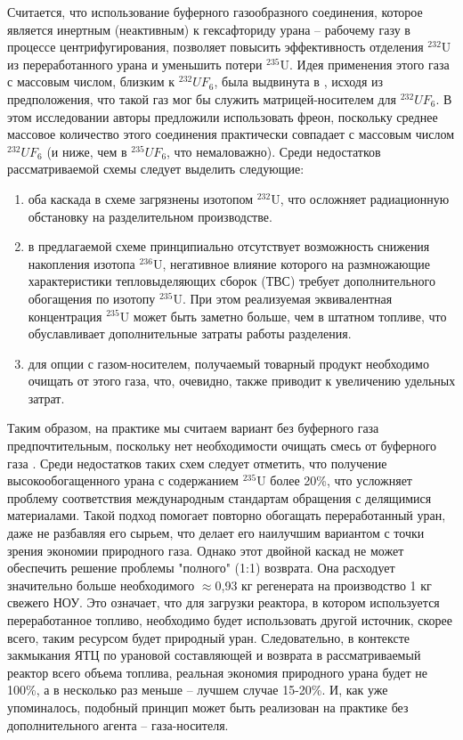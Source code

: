Считается, что использование буферного газообразного соединения, которое является инертным (неактивным) к гексафториду урана -- рабочему газу в процессе центрифугирования, позволяет повысить эффективность отделения $^{232}$U из переработанного урана и уменьшить потери $^{235}$U. Идея применения этого газа с массовым числом, близким к $^{232}UF_6$, была выдвинута в \cite{SosninYuChelcov}, исходя из предположения, что такой газ мог бы служить матрицей-носителем для $^{232}UF_6$. В этом исследовании авторы предложили использовать фреон, поскольку среднее массовое количество этого соединения практически совпадает с массовым числом $^{232}UF_6$ (и ниже, чем в $^{235}UF_6$, что немаловажно).
Среди недостатков рассматриваемой схемы следует выделить следующие:
\begin{enumerate}
  \item оба каскада в схеме загрязнены изотопом $^{232}$U, что осложняет радиационную обстановку на разделительном производстве.
  \item в предлагаемой схеме принципиально отсутствует возможность снижения накопления изотопа $^{236}$U, негативное влияние которого на размножающие характеристики тепловыделяющих сборок (ТВС) требует дополнительного обогащения по изотопу $^{235}$U. При этом реализуемая эквивалентная концентрация $^{235}$U может быть заметно больше, чем в штатном топливе, что обуславливает дополнительные затраты работы разделения.
  \item для опции с газом-носителем, получаемый товарный продукт необходимо очищать от этого газа, что, очевидно, также приводит к увеличению удельных затрат.
\end{enumerate}

Таким образом, на практике мы считаем вариант без буферного газа предпочтительным, поскольку нет необходимости очищать смесь от буферного газа \cite{smirnovKaskadnyeShemyZadachah2012}. Среди недостатков таких схем следует отметить, что получение высокообогащенного урана с содержанием $^{235}$U более 20\%, что усложняет проблему соответствия международным стандартам обращения с делящимися материалами.
Такой подход помогает повторно обогащать переработанный уран, даже не разбавляя его сырьем, что делает его наилучшим вариантом с точки зрения экономии природного газа. Однако этот двойной каскад не может обеспечить решение проблемы "полного" (1:1) возврата. Она расходует значительно больше необходимого $\approx$0,93 кг регенерата на производство 1 кг свежего НОУ. Это означает, что для загрузки реактора, в котором используется переработанное топливо, необходимо будет использовать другой источник, скорее всего, таким ресурсом будет природный уран. Следовательно, в контексте закмыкания ЯТЦ по урановой составляющей и возврата в рассматриваемый реактор всего объема топлива, реальная экономия природного урана будет не 100\%, а в несколько раз меньше -- лучшем случае 15-20\%. И, как уже упоминалось, подобный принцип может быть реализован на практике без дополнительного агента -- газа-носителя.


